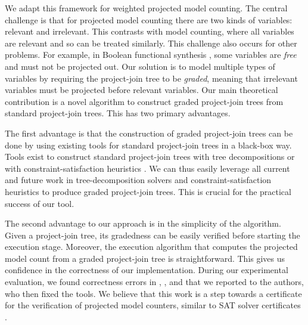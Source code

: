 We adapt this framework for weighted projected model counting. The central challenge is that for projected model counting there are two kinds of variables: relevant and irrelevant. This contrasts with model counting, where all variables are relevant and so can be treated similarly. This challenge also occurs for other problems.
For example, in Boolean functional synthesis \cite{tabajara2017factored}, some variables are \emph{free} and must not be projected out. 
Our solution is to model multiple types of variables by requiring the project-join tree to be \emph{graded}, meaning that irrelevant variables must be projected before relevant variables. Our main theoretical contribution is a novel algorithm to construct graded project-join trees from standard project-join trees. This has two primary advantages. 

The first advantage is that the construction of graded project-join trees can be done by using existing tools for standard project-join trees \cite{dudek2020dpmc} in a black-box way. Tools exist to construct standard project-join trees with tree decompositions \cite{RS91} or with constraint-satisfaction heuristics \cite{tarjan1984simple,koster2001treewidth,dechter03,dechter99,bouquet1999gestion}.
We can thus easily leverage all current and future work in tree-decomposition solvers \cite{strasser2017computing,AMW17,Tamaki17} and constraint-satisfaction heuristics to produce graded project-join trees. This is crucial for the practical success of our tool.

The second advantage to our approach is in the simplicity of the algorithm. Given a project-join tree, its gradedness can be easily verified before starting the execution stage. 
Moreover, the execution algorithm that computes the projected model count from a graded project-join tree is straightforward. This gives us confidence in the correctness of our implementation.
During our experimental evaluation, we found correctness errors in \dfp{} \cite{lagniez2019recursive}, \projmc{} \cite{lagniez2019recursive}, and \ssat{} \cite{lee2017solving} that we reported to the authors, who then fixed the tools. 
We believe that this work is a step towards a certificate for the verification of projected model counters, similar to SAT solver certificates \cite{wetzler2014drat}.

